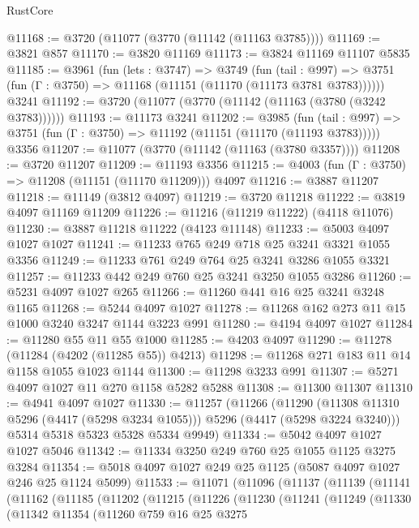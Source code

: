 \begin{lexlean}{RustCore}
\begin{coremodule}
@11168 := @3720 (@11077 (@3770 (@11142 (@11163 @3785))))
@11169 := @3821 @857
@11170 := @3820 @11169
@11173 := @3824 @11169 @11107 @5835
@11185 := @3961
    (fun (lets : @3747) =>
    @3749
      (fun (tail : @997) =>
      @3751 (fun (Γ : @3750) => @11168 (@11151 (@11170 (@11173 @3781 @3783))))))
    @3241
@11192 := @3720 (@11077 (@3770 (@11142 (@11163 (@3780 (@3242 @3783))))))
@11193 := @11173 @3241
@11202 := @3985
    (fun (tail : @997) => @3751 (fun (Γ : @3750) => @11192 (@11151 (@11170 (@11193 @3783)))))
    @3356
@11207 := @11077 (@3770 (@11142 (@11163 (@3780 @3357))))
@11208 := @3720 @11207
@11209 := @11193 @3356
@11215 := @4003 (fun (Γ : @3750) => @11208 (@11151 (@11170 @11209))) @4097
@11216 := @3887 @11207
@11218 := @11149 (@3812 @4097)
@11219 := @3720 @11218
@11222 := @3819 @4097 @11169 @11209
@11226 := @11216 (@11219 @11222) (@4118 @11076)
@11230 := @3887 @11218 @11222 (@4123 @11148)
@11233 := @5003 @4097 @1027 @1027
@11241 := @11233 @765 @249 @718 @25 @3241 @3321 @1055 @3356
@11249 := @11233 @761 @249 @764 @25 @3241 @3286 @1055 @3321
@11257 := @11233 @442 @249 @760 @25 @3241 @3250 @1055 @3286
@11260 := @5231 @4097 @1027 @265
@11266 := @11260 @441 @16 @25 @3241 @3248 @1165
@11268 := @5244 @4097 @1027
@11278 := @11268 @162 @273 @11 @15 @1000 @3240 @3247 @1144 @3223 @991
@11280 := @4194 @4097 @1027
@11284 := @11280 @55 @11 @55 @1000
@11285 := @4203 @4097
@11290 := @11278 (@11284 (@4202 (@11285 @55)) @4213)
@11298 := @11268 @271 @183 @11 @14 @1158 @1055 @1023 @1144
@11300 := @11298 @3233 @991
@11307 := @5271 @4097 @1027 @11 @270 @1158 @5282 @5288
@11308 := @11300 @11307
@11310 := @4941 @4097 @1027
@11330 := @11257
    (@11266
      (@11290 (@11308 @11310 @5296 (@4417 (@5298 @3234 @1055))) @5296 (@4417 (@5298 @3224 @3240)))
      @5314
      @5318
      @5323
      @5328
      @5334
      @9949)
@11334 := @5042 @4097 @1027 @1027 @5046
@11342 := @11334 @3250 @249 @760 @25 @1055 @1125 @3275 @3284
@11354 := @5018 @4097 @1027 @249 @25 @1125 (@5087 @4097 @1027 @246 @25 @1124 @5099)
@11533 := @11071
    (@11096
      (@11137
        (@11139
          (@11141
            (@11162
              (@11185
                (@11202
                  (@11215
                    (@11226
                      (@11230
                        (@11241
                          (@11249
                            (@11330
                              (@11342
                                @11354
                                (@11260
                                  @759
                                  @16
                                  @25
                                  @3275

\end{coremodule}
\end{lexlean}
